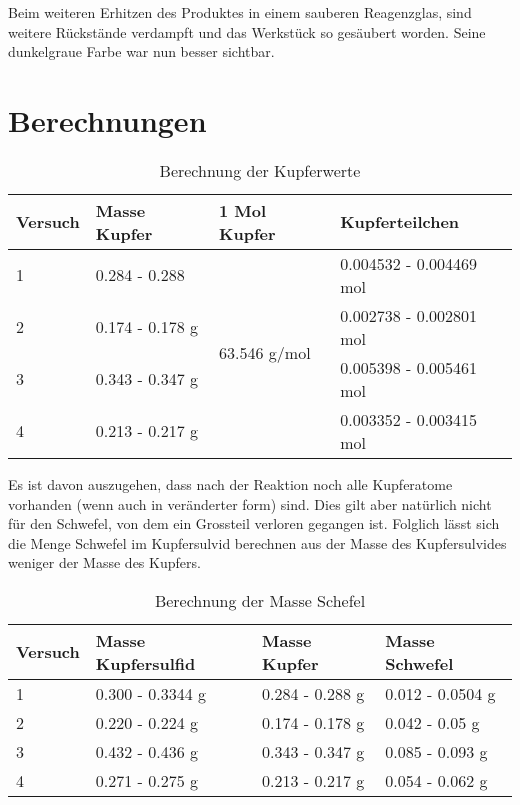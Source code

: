 \documentclass[11pt,paper=a4,final]{scrartcl}
\begin{document}
{Beim weiteren Erhitzen des Produktes in einem sauberen Reagenzglas, sind
weitere R\"uckst\"ande verdampft und das Werkst\"uck so ges\"aubert worden. Seine
dunkelgraue Farbe war nun besser sichtbar.
\section{Berechnungen}
\begin{table}[h!]
  \centering
  \begin{tabular}{|l|l|l|l|} \hline
    \bf Versuch & \bf Masse Kupfer & \bf 1 Mol Kupfer & \bf Kupferteilchen \\ \hline
    1	& 0.284 - 0.288	& \multirow{4}{*}{63.546 g/mol}	& 0.004532 - 0.004469
    mol \\ \cline{1-2} \cline{4-4}
    2	& 0.174 - 0.178 g& & 0.002738 - 0.002801 mol \\ \cline{1-2} \cline{4-4}
    3 	& 0.343 - 0.347 g& & 0.005398 - 0.005461 mol \\ \cline{1-2} \cline{4-4}
    4	& 0.213 - 0.217 g& & 0.003352 - 0.003415 mol \\ \hline
  \end{tabular}
  \caption{Berechnung der Kupferwerte}
  \label{tab:kupfer}
\end{table}

Es ist davon auszugehen, dass nach der Reaktion noch alle Kupferatome vorhanden
(wenn auch in ver\"anderter form) sind. Dies gilt aber nat\"urlich nicht f\"ur
den Schwefel, von dem ein Grossteil verloren gegangen ist. Folglich l\"asst sich
die Menge Schwefel im Kupfersulvid berechnen aus der Masse des Kupfersulvides
weniger der Masse des Kupfers.
\begin{table}[h!]
  \centering
  \begin{tabular}{|l|l|l|l|}\hline
  \bf Versuch & \bf Masse Kupfersulfid & \bf Masse Kupfer & \bf Masse Schwefel
  \\ \hline
  1 & 0.300 - 0.3344 g	& 0.284 - 0.288 g	& 0.012 - 0.0504 g \\ \hline
  2 & 0.220 - 0.224 g	& 0.174 - 0.178 g	& 0.042 - 0.05 g \\ \hline
  3 & 0.432 - 0.436 g	& 0.343 - 0.347 g	& 0.085 - 0.093 g \\ \hline
  4 & 0.271 - 0.275 g	& 0.213 - 0.217 g	& 0.054 - 0.062 g \\ \hline
  \end{tabular}
  \caption{Berechnung der Masse Schefel}
  \label{tab:schwefel}
\end{table}

}
\end{document}
